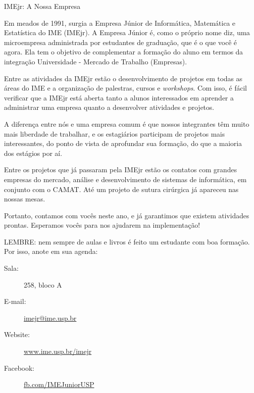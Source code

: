 \begin{subsecao}{IMEjr: A Nossa Empresa}


Em meados de 1991, surgia a Empresa Júnior de Informática, Matemática
e Estatística do IME (IMEjr). A Empresa Júnior é, como o próprio nome
diz, uma microempresa administrada por estudantes de graduação, que é
o que você é agora. Ela tem o objetivo de complementar a formação do
aluno em termos da integração Universidade - Mercado de Trabalho
(Empresas).

Entre as atividades da IMEjr estão o desenvolvimento de
projetos em todas as áreas do IME e a organização de palestras, cursos
e \textit{workshops}. Com isso, é fácil verificar que a IMEjr está aberta tanto
a alunos interessados em aprender a administrar uma empresa quanto a
desenvolver atividades e projetos.

A diferença entre nós e uma
empresa comum é que nossos integrantes têm muito mais liberdade de
trabalhar, e os estagiários participam de projetos mais interessantes,
do ponto de vista de aprofundar sua formação, do que a maioria dos
estágios por aí.

Entre os projetos que já passaram pela IMEjr estão
os contatos com grandes empresas do mercado, análise e desenvolvimento
de sistemas de informática, em conjunto com o CAMAT. Até um projeto
de sutura cirúrgica já apareceu nas nossas mesas.

Portanto, contamos
com vocês neste ano, e já garantimos que existem atividades
prontas. Esperamos vocês para nos ajudarem na implementação!

LEMBRE: nem sempre de aulas e livros é feito um estudante com boa
formação. Por isso, anote em sua agenda: 
\begin{description}
\item [Sala:] 258, bloco A
\item[E-mail:] \url{imejr@ime.usp.br}
\item[Website:] \url{www.ime.usp.br/imejr}
\item[Facebook:] \url{fb.com/IMEJuniorUSP}
\end{description}

\end{subsecao}
